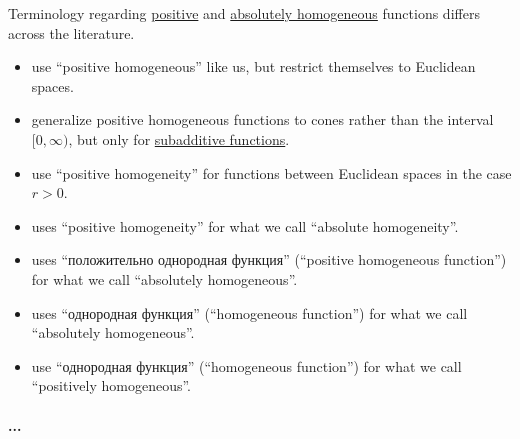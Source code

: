 \begin{remark}\label{rem:positive_homogeneous_function}
  Terminology regarding \hyperref[def:real_homogeneous_function/positive]{positive} and \hyperref[def:real_homogeneous_function/absolute]{absolutely homogeneous} functions differs across the literature.
  \begin{itemize}
    \item \Textcite[rem. 2.10]{HugWeil2020ConvexGeometry} use \enquote{positive homogeneous} like us, but restrict themselves to Euclidean spaces.

    \item \Textcite[def. 7.12.2]{HillePhillips1996FunctionalAnalysis} generalize positive homogeneous functions to cones rather than the interval \( [0, \infty) \), but only for \hyperref[def:additive_function/sub]{subadditive functions}.

    \item \Textcite[95]{DontchevRockafellar2014SolutionMappings} use \enquote{positive homogeneity} for functions between Euclidean spaces in the case \( r > 0 \).

    \item \Textcite[3]{Clarke2013OptimalControl} uses \enquote{positive homogeneity} for what we call \enquote{absolute homogeneity}.

    \item \Textcite[416]{Зорич2019АнализЧасть1} uses \enquote{положительно однородная функция} (\enquote{positive homogeneous function}) for what we call \enquote{absolutely homogeneous}.

    \item \Textcite[80]{КанторовичАкилов1984ФункциональныйАнализ} uses \enquote{однородная функция} (\enquote{homogeneous function}) for what we call \enquote{absolutely homogeneous}.

    \item \Textcite[12]{МагарилИльяевТихомиров2002ВыпуклыйАнализ} use \enquote{однородная функция} (\enquote{homogeneous function}) for what we call \enquote{positively homogeneous}.
  \end{itemize}
\end{remark}

\paragraph{...}

